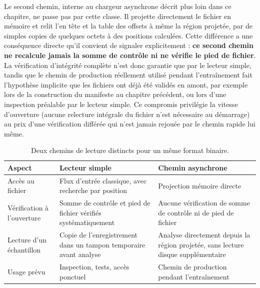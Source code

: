\documentclass[12pt,a4paper]{report}
\begin{document}
Le second chemin, interne au chargeur asynchrone décrit plus loin dans ce chapitre, ne passe pas par cette classe. Il projette directement le fichier en mémoire et relit l'en tête et la table des offsets à même la région projetée, par de simples copies de quelques octets à des positions calculées. Cette différence a une conséquence directe qu'il convient de signaler explicitement : \textbf{ce second chemin ne recalcule jamais la somme de contrôle ni ne vérifie le pied de fichier}. La vérification d'intégrité complète n'est donc garantie que par le lecteur simple, tandis que le chemin de production réellement utilisé pendant l'entraînement fait l'hypothèse implicite que les fichiers ont déjà été validés en amont, par exemple lors de la construction du manifeste au chapitre précédent, ou lors d'une inspection préalable par le lecteur simple. Ce compromis privilégie la vitesse d'ouverture (aucune relecture intégrale du fichier n'est nécessaire au démarrage) au prix d'une vérification différée qui n'est jamais rejouée par le chemin rapide lui même.

\begin{table}[htbp]
\centering
\renewcommand{\arraystretch}{1.5}
\begin{tabular}{|p{3.0cm}|p{5.0cm}|p{5.0cm}|}
\hline
\textbf{Aspect} & \textbf{Lecteur simple} & \textbf{Chemin asynchrone} \\
\hline
Accès au fichier & Flux d'entrée classique, avec recherche par position & Projection mémoire directe \\
\hline
Vérification à l'ouverture & Somme de contrôle et pied de fichier vérifiés systématiquement & Aucune vérification de somme de contrôle ni de pied de fichier \\
\hline
Lecture d'un échantillon & Copie de l'enregistrement dans un tampon temporaire avant analyse & Analyse directement depuis la région projetée, sans lecture disque supplémentaire \\
\hline
Usage prévu & Inspection, tests, accès ponctuel & Chemin de production pendant l'entraînement \\
\hline
\end{tabular}
\caption{Deux chemins de lecture distincts pour un même format binaire.}
\label{tab:deux_lecteurs}
\end{table}
\end{document}
